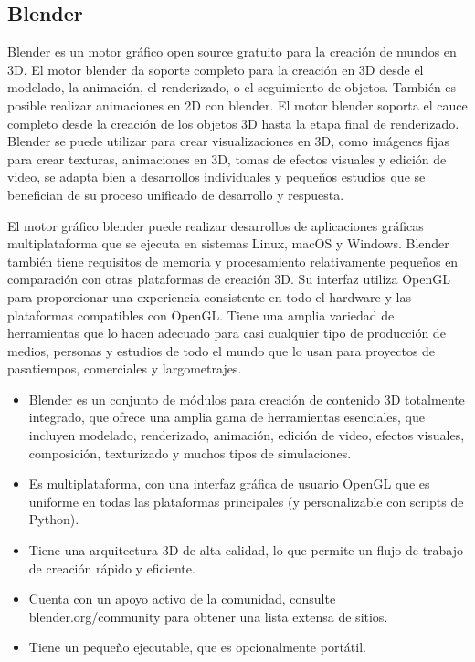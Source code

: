 \documentclass[a4paper, 17pt]{book}
\begin{document}
\subsection{Blender} 
\label{subsec:Blender}

Blender es un motor gráfico open source gratuito para la creación de mundos en 3D. El motor blender da soporte completo
para la creación en 3D desde el modelado, la animación, el renderizado, o el seguimiento de objetos. También es posible
realizar animaciones en 2D con blender. El motor blender soporta el cauce completo desde la creación de los objetos 3D
hasta la etapa final de renderizado. Blender se puede utilizar para crear visualizaciones en 3D, como imágenes fijas para
crear texturas, animaciones en 3D, tomas de efectos visuales y edición de video, se adapta bien a desarrollos individuales
y pequeños estudios que se benefician de su proceso unificado de desarrollo y respuesta.

El motor gráfico blender puede realizar desarrollos de aplicaciones gráficas multiplataforma que se ejecuta en sistemas Linux,
macOS y Windows. Blender también tiene requisitos de memoria y procesamiento relativamente pequeños en comparación con otras
plataformas de creación 3D. Su interfaz utiliza OpenGL para proporcionar una experiencia consistente en todo el hardware
y las plataformas compatibles con OpenGL. Tiene una amplia variedad de herramientas que lo hacen adecuado para casi cualquier
tipo de producción de medios, personas y estudios de todo el mundo que lo usan para proyectos de pasatiempos, comerciales y
largometrajes.


\begin{itemize}
  \item Blender es un conjunto de módulos para creación de contenido 3D totalmente integrado, que ofrece una amplia gama de
  herramientas esenciales, que incluyen modelado, renderizado, animación, edición de video, efectos visuales, composición,
  texturizado y muchos tipos de simulaciones.

  \item Es multiplataforma, con una interfaz gráfica de usuario OpenGL que es uniforme en todas las plataformas principales
  (y personalizable con scripts de Python).

  \item Tiene una arquitectura 3D de alta calidad, lo que permite un flujo de trabajo de creación rápido y eficiente.

  \item Cuenta con un apoyo activo de la comunidad, consulte blender.org/community para obtener una lista extensa de sitios.

  \item Tiene un pequeño ejecutable, que es opcionalmente portátil.
\end{itemize}
\end{document}
